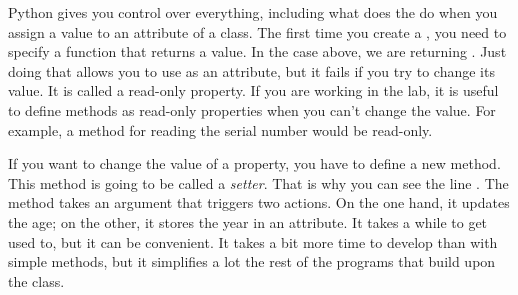 Python gives you control over everything, including what does the \py{=} do when you assign a value to an attribute of a class. The first time you create a , you need to specify a function that returns a value. In the case above, we are returning . Just doing that allows you to use  as an attribute, but it fails if you try to change its value. It is called a read-only property. If you are working in the lab, it is useful to define methods as read-only properties when you can't change the value. For example, a method for reading the serial number would be read-only.

If you want to change the value of a property, you have to define a new method. This method is going to be called a \textit{setter}. That is why you can see the line . The method takes an argument that triggers two actions. On the one hand, it updates the age; on the other, it stores the year in an attribute. It takes a while to get used to, but it can be convenient. It takes a bit more time to develop than with simple methods, but it simplifies a lot the rest of the programs that build upon the class.
